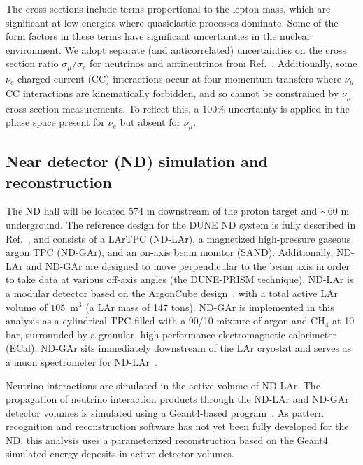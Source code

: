 The cross sections include terms proportional to the lepton mass, which are significant at low energies where quasielastic processes dominate. Some of the form factors in these terms have significant uncertainties in the nuclear environment. We adopt separate (and anticorrelated) uncertainties on the cross section ratio $\sigma_\mu/\sigma_e$ for neutrinos and antineutrinos from Ref.~\cite{Day:2012gb}. Additionally, some $\nu_e$ charged-current (CC) interactions occur at four-momentum transfers where $\nu_\mu$ CC interactions are kinematically forbidden, and so cannot be constrained by $\nu_\mu$ cross-section measurements. To reflect this, a 100\% uncertainty is applied in the phase space present for $\nu_e$ but absent for $\nu_\mu$.

\subsection{Near detector (ND) simulation and reconstruction}
The ND hall will be located 574 m downstream of the proton target and $\sim$60 m underground. The reference design for the DUNE ND system is fully described in Ref.~\cite{AbedAbud:2021hpb}, and consists of a LArTPC (ND-LAr), a magnetized high-pressure gaseous argon TPC (ND-GAr), and an on-axis beam monitor (SAND). Additionally, ND-LAr and ND-GAr are designed to move perpendicular to the beam axis in order to take data at various off-axis angles (the DUNE-PRISM technique). ND-LAr is a modular detector based on the ArgonCube design~\cite{argoncube_loi, Dwyer:2018phu, arclight}, with a total active LAr volume of $105$~m$^{3}$ (a LAr mass of 147 tons). ND-GAr is implemented in this analysis as a cylindrical TPC filled with a 90/10 mixture of argon and CH$_{4}$ at 10 bar, surrounded by a granular, high-performance electromagnetic calorimeter (ECal). ND-GAr sits immediately downstream of the LAr cryostat and serves as a muon spectrometer for ND-LAr~\cite{Emberger:2018pgr}.

Neutrino interactions are simulated in the active volume of ND-LAr. The propagation of neutrino interaction products through the ND-LAr and ND-GAr detector volumes is simulated using a Geant4-based program~\cite{Agostinelli:2002hh}. As pattern recognition and reconstruction software has not yet been fully developed for the ND, this analysis uses a parameterized reconstruction based on the Geant4 simulated energy deposits in active detector volumes.

